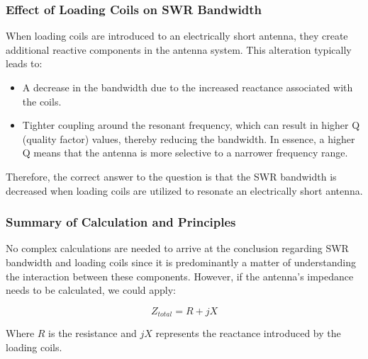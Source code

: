 \subsubsection{Effect of Loading Coils on SWR Bandwidth}
When loading coils are introduced to an electrically short antenna, they create additional reactive components in the antenna system. This alteration typically leads to:

\begin{itemize}
    \item A decrease in the bandwidth due to the increased reactance associated with the coils.
    \item Tighter coupling around the resonant frequency, which can result in higher Q (quality factor) values, thereby reducing the bandwidth. In essence, a higher Q means that the antenna is more selective to a narrower frequency range.
\end{itemize}

Therefore, the correct answer to the question is that the SWR bandwidth is decreased when loading coils are utilized to resonate an electrically short antenna.

\subsubsection{Summary of Calculation and Principles}
No complex calculations are needed to arrive at the conclusion regarding SWR bandwidth and loading coils since it is predominantly a matter of understanding the interaction between these components. However, if the antenna's impedance needs to be calculated, we could apply:

\[
Z_{total} = R + jX
\]

Where \( R \) is the resistance and \( jX \) represents the reactance introduced by the loading coils.


